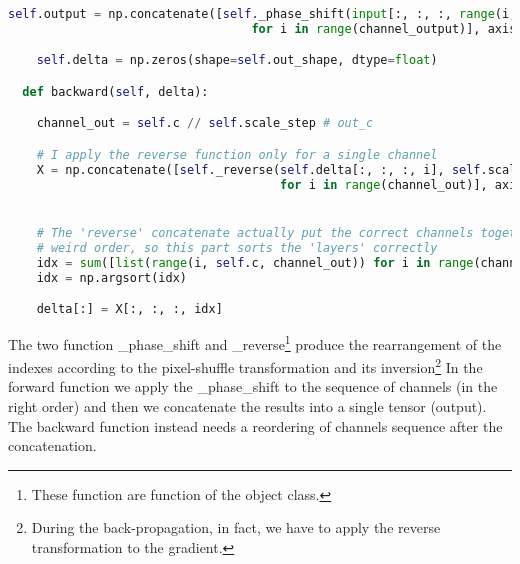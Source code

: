 \documentclass{standalone}
\begin{document}
\begin{lstlisting}[language=Python, caption=NumPyNet version of Pixel-Shuffle function, label=code:py_shuffle]
    self.output = np.concatenate([self._phase_shift(input[:, :, :, range(i, self.c, channel_output)], self.scale)
                                  for i in range(channel_output)], axis=3)

    self.delta = np.zeros(shape=self.out_shape, dtype=float)

  def backward(self, delta):

    channel_out = self.c // self.scale_step # out_c

    # I apply the reverse function only for a single channel
    X = np.concatenate([self._reverse(self.delta[:, :, :, i], self.scale)
                                      for i in range(channel_out)], axis=3)


    # The 'reverse' concatenate actually put the correct channels together but in a
    # weird order, so this part sorts the 'layers' correctly
    idx = sum([list(range(i, self.c, channel_out)) for i in range(channel_out)], [])
    idx = np.argsort(idx)

    delta[:] = X[:, :, :, idx]

\end{lstlisting}

The two function \textsf{\_phase\_shift} and \textsf{\_reverse}\footnote{
  These function are  function of the object class.
}
produce the rearrangement of the indexes according to the pixel-shuffle transformation and its inversion\footnote{
  During the back-propagation, in fact, we have to apply the reverse transformation to the gradient.
}
In the forward function we apply the \textsf{\_phase\_shift} to the sequence of channels (in the right order) and then we concatenate the results into a single tensor (output).
The backward function instead needs a reordering of channels sequence after the concatenation.
\end{document}
